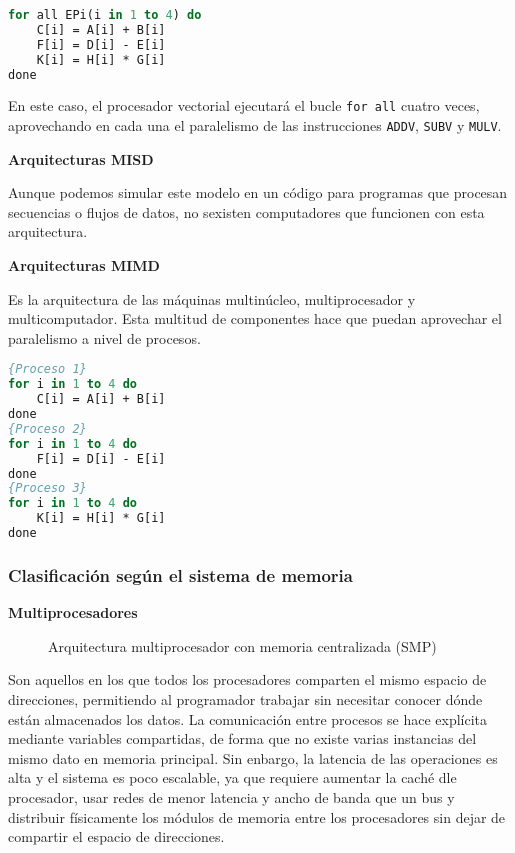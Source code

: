 \begin{lstlisting}[language=Pascal]
for all EPi(i in 1 to 4) do
	C[i] = A[i] + B[i]
	F[i] = D[i] - E[i]
	K[i] = H[i] * G[i]
done
\end{lstlisting}

En este caso, el procesador vectorial ejecutará el bucle \texttt{for all} cuatro veces, aprovechando en cada una el paralelismo de las instrucciones \texttt{ADDV}, \texttt{SUBV} y \texttt{MULV}.

\textbf{Arquitecturas MISD}

Aunque podemos simular este modelo en un código para programas que procesan secuencias o flujos de datos, no sexisten computadores que funcionen con esta arquitectura.

\textbf{Arquitecturas MIMD}

Es la arquitectura de las máquinas multinúcleo, multiprocesador y multicomputador.
Esta multitud de componentes hace que puedan aprovechar el paralelismo a nivel de procesos.

\pagebreak

\begin{lstlisting}[language=Pascal]
{Proceso 1}
for i in 1 to 4 do
	C[i] = A[i] + B[i]
done
{Proceso 2}
for i in 1 to 4 do
	F[i] = D[i] - E[i]
done
{Proceso 3}
for i in 1 to 4 do
	K[i] = H[i] * G[i]
done
\end{lstlisting}

\subsubsection{Clasificación según el sistema de memoria}

\textbf{Multiprocesadores}

\begin{figure}[h]
\begin{center}

\end{center}
\caption{Arquitectura multiprocesador con memoria centralizada (SMP)}
\end{figure}

Son aquellos en los que todos los procesadores comparten el mismo espacio de direcciones, permitiendo al programador trabajar sin necesitar conocer dónde están almacenados los datos.
La comunicación entre procesos se hace explícita mediante variables compartidas, de forma que no existe varias instancias del mismo dato en memoria principal.
Sin enbargo, la latencia de las operaciones es alta y el sistema es poco escalable, ya que requiere aumentar la caché dle procesador, usar redes de menor latencia y ancho de banda que un bus y distribuir físicamente los módulos de memoria entre los procesadores sin dejar de compartir el espacio de direcciones.

